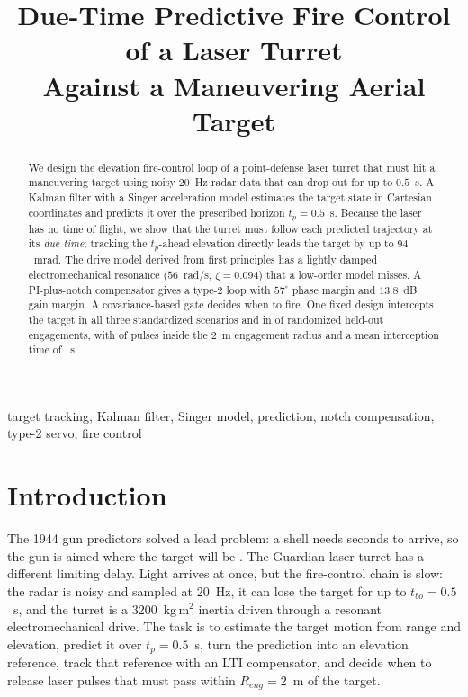 \documentclass[conference]{IEEEtran}
\newcommand{\Reng}{R_{eng}}
\begin{document}
\title{Due-Time Predictive Fire Control of a Laser Turret\\Against a Maneuvering Aerial Target}

\author{
}

\maketitle

\begin{abstract}
We design the elevation fire-control loop of a point-defense laser turret that must hit a maneuvering target using noisy $20$~Hz radar data that can drop out for up to $0.5$~s. A Kalman filter with a Singer acceleration model estimates the target state in Cartesian coordinates and predicts it over the prescribed horizon $t_p=0.5$~s. Because the laser has no time of flight, we show that the turret must follow each predicted trajectory at its \emph{due time}; tracking the $t_p$-ahead elevation directly leads the target by up to $94$~mrad. The drive model derived from first principles has a lightly damped electromechanical resonance ($56$~rad/s, $\zeta=0.094$) that a low-order model misses. A PI-plus-notch compensator gives a type-2 loop with $57^\circ$ phase margin and $13.8$~dB gain margin. A covariance-based gate decides when to fire. One fixed design intercepts the target in all three standardized scenarios and in \EvSucc{} of \EvN{} randomized held-out engagements, with \EvHits{} of \EvPulses{} pulses inside the $2$~m engagement radius and a mean interception time of \EvTintMean~s.
\end{abstract}

\begin{IEEEkeywords}
target tracking, Kalman filter, Singer model, prediction, notch compensation, type-2 servo, fire control
\end{IEEEkeywords}

\section{Introduction}
The 1944 gun predictors solved a lead problem: a shell needs seconds to arrive, so the gun is aimed where the target will be \cite{mindell}. The Guardian laser turret has a different limiting delay. Light arrives at once, but the fire-control chain is slow: the radar is noisy and sampled at $20$~Hz, it can lose the target for up to $t_{bo}=0.5$~s, and the turret is a $3200$~kg\,m$^2$ inertia driven through a resonant electromechanical drive. The task is to estimate the target motion from range and elevation, predict it over $t_p=0.5$~s, turn the prediction into an elevation reference, track that reference with an LTI compensator, and decide when to release laser pulses that must pass within $\Reng=2$~m of the target.
\end{document}
